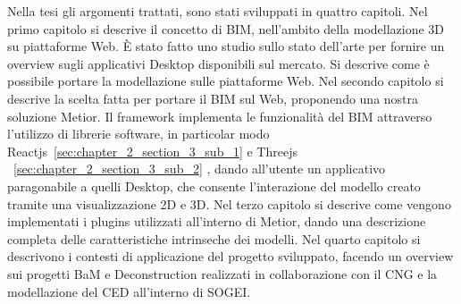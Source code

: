 Nella tesi gli argomenti trattati, sono stati sviluppati in quattro capitoli.
Nel primo capitolo si descrive il concetto di BIM,
nell'ambito della modellazione 3D su piattaforme Web. \`E stato fatto uno studio sullo stato dell'arte
per fornire un overview sugli applicativi Desktop disponibili sul mercato.
Si descrive come \`e possibile portare la modellazione sulle piattaforme Web.
Nel secondo capitolo si descrive la scelta fatta per portare il BIM sul Web, proponendo una nostra soluzione Metior.
Il framework implementa le funzionalit\`a del BIM attraverso l'utilizzo di librerie software,
in particolar modo Reactjs~\ref{sec:chapter_2_section_3_sub_1} e Threejs ~\ref{sec:chapter_2_section_3_sub_2} ,
dando all'utente un applicativo paragonabile a quelli
Desktop, che consente l'interazione del modello creato tramite una visualizzazione 2D e 3D.
Nel terzo capitolo si descrive come vengono implementati i plugins utilizzati all'interno di Metior,
dando una descrizione completa delle caratteristiche intrinseche dei modelli.
Nel quarto capitolo si descrivono i contesti di applicazione del progetto sviluppato,
facendo un overview sui progetti BaM e Deconstruction realizzati in collaborazione con il CNG
e la modellazione del CED all'interno di SOGEI.
